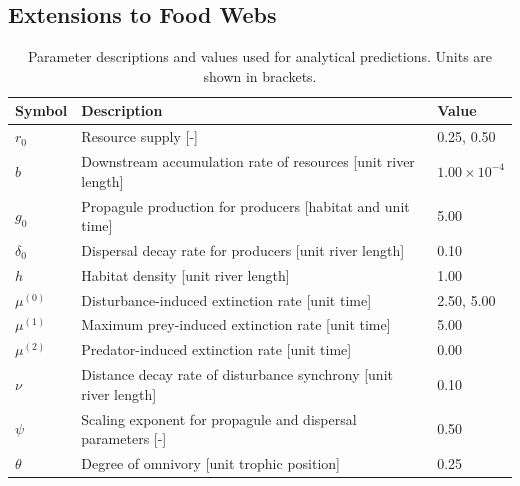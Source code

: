 \documentclass[9pt,twocolumn,twoside]{pnas-new}
\begin{document}
\subsection{Extensions to Food Webs}

\begin{table}[ht]
\centering
\caption{Parameter descriptions and values used for analytical predictions. Units are shown in brackets.} 
\label{tab:parms}
\begin{tabularx}{\textwidth}{lll}
  \hline
Symbol & Description & Value \\ 
  \hline
$r_0$ & Resource supply [-] & 0.25, 0.50 \\ 
  $b$ & Downstream accumulation rate of resources [unit river length] & $1.00 \times 10^{-4}$ \\ 
  $g_0$ & Propagule production for producers [habitat and unit time] & 5.00 \\ 
  $\delta_0$ & Dispersal decay rate for producers [unit river length] & 0.10 \\ 
  $h$ & Habitat density [unit river length] & 1.00 \\ 
  $\mu^{(0)}$ & Disturbance-induced extinction rate [unit time] & 2.50, 5.00 \\ 
  $\mu^{(1)}$ & Maximum prey-induced extinction rate [unit time] & 5.00 \\ 
  $\mu^{(2)}$ & Predator-induced extinction rate [unit time] & 0.00 \\ 
  $\nu$ & Distance decay rate of disturbance synchrony [unit river length] & 0.10 \\ 
  $\psi$ & Scaling exponent for propagule and dispersal parameters [-] & 0.50 \\ 
  $\theta$ & Degree of omnivory [unit trophic position] & 0.25 \\ 
   \hline
\end{tabularx}
\end{table}
\end{document}
